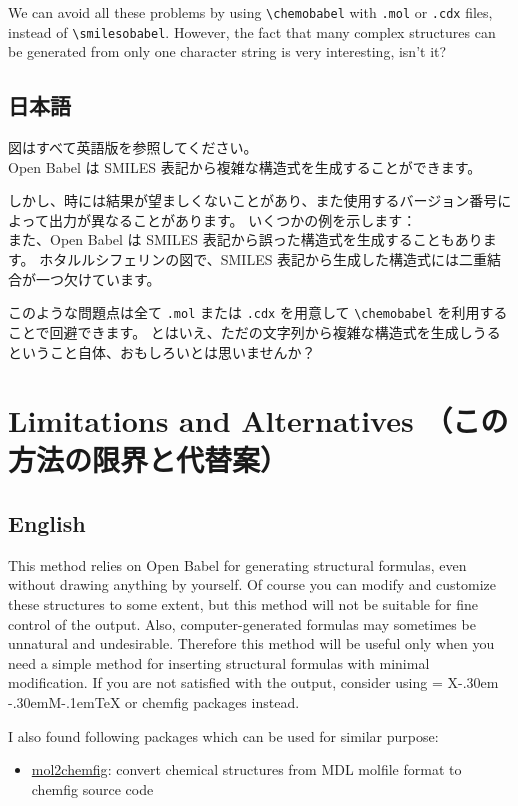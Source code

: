 \documentclass[12pt]{jsarticle}
\def\XyM{\ifnum\fam=-1\relax\fam=0\relax\fi\TestCount=\fam%
X\kern-.30em\smash{\raise.50ex\hbox{$\fam\TestCount\Upsilon$}}%
\kern-.30em{M}}
\def\XyMTeX{\XyM\kern-.1em\TeX}
\begin{document}
We can avoid all these problems by using \verb|\chemobabel| with \verb|.mol| or \verb|.cdx| files, instead of \verb|\smilesobabel|.
However, the fact that many complex structures can be generated from only one character string is very interesting, isn't it?

\subsection{日本語}

図はすべて英語版を参照してください。 \\

Open Babel は SMILES 表記から複雑な構造式を生成することができます。

しかし、時には結果が望ましくないことがあり、また使用するバージョン番号によって出力が異なることがあります。
いくつかの例を示します： \\

また、Open Babel は SMILES 表記から誤った構造式を生成することもあります。
ホタルルシフェリンの図で、SMILES 表記から生成した構造式には二重結合が一つ欠けています。

このような問題点は全て \verb|.mol| または \verb|.cdx| を用意して \verb|\chemobabel| を利用することで回避できます。
とはいえ、ただの文字列から複雑な構造式を生成しうるということ自体、おもしろいとは思いませんか？

\section{Limitations and Alternatives （この方法の限界と代替案）}

\subsection{English}

This method relies on Open Babel for generating structural formulas, even without drawing anything by yourself.
Of course you can modify and customize these structures to some extent, but this method will not be suitable for fine control of the output.
Also, computer-generated formulas may sometimes be unnatural and undesirable.
Therefore this method will be useful only when you need a simple method for inserting structural formulas with minimal modification.
If you are not satisfied with the output, consider using {\XyMTeX} or \textsf{chemfig} packages instead.

I also found following packages which can be used for similar purpose:
\begin{itemize}
\item \href{http://www.ctan.org/pkg/mol2chemfig}{\textsf{mol2chemfig}}: convert chemical structures from MDL molfile format to \textsf{chemfig} source code
\end{itemize}
\end{document}
